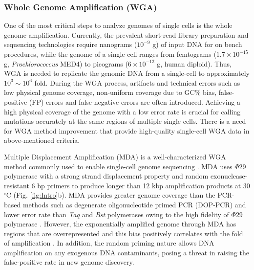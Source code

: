 \subsubsection{Whole Genome Amplification (WGA)}
One of the most critical steps to analyze genomes of single cells is the whole genome amplification. Currently, the prevalent short-read library preparation and sequencing technologies require nanograms ($10^{-9}$ g) of input DNA for on bench procedures, while the genome of a single cell ranges from femtograms ($1.7 \times 10^{-15}$ g, \textit{Prochlorococcus} MED4) to picograms ($6 \times 10^{-12}$ g, human diploid). Thus, WGA is needed to replicate the genomic DNA from a single-cell to approximately $10^3 \sim 10^6$ fold. During the WGA process, artifacts and technical errors such as low physical genome coverage, non-uniform coverage due to GC\% bias, false-positive (FP) errors and false-negative errors are often introduced. Achieving a high physical coverage of the genome with a low error rate is crucial for calling mutations accurately at the same regions of multiple single cells. There is a need for WGA method improvement that provide high-quality single-cell WGA data in above-mentioned criteria.

Multiple Displacement Amplification (MDA) \cite{Dean:2002us} is a well-characterized WGA method commonly used to enable single-cell genome sequencing \cite{Marcy:2007il,Fu:2015gl,Zhang:2006hq,Raghunathan:2005fg,Pamp:2012cj,Dodsworth:2013ih,Hess:2011gu}. MDA uses $\Phi$29 polymerase with a strong strand displacement property and random exonuclease-resistant 6 bp primers to produce longer than 12 kbp amplification products at 30 $^{\circ}$C (Fig. \ref{fig:Intro}b). MDA provides greater genome coverage than the PCR-based methods such as degenerate oligonucleotide primed PCR (DOP-PCR) and lower error rate than \textit{Taq} and \textit{Bst} polymerases owing to the high fidelity of $\Phi$29 polymerase \cite{Dean:2002us}. However, the exponentially amplified genome through MDA has regions that are overrepresented and this bias positively correlates with the fold of amplification \cite{deBourcy:2014ji}. In addition, the random priming nature allows DNA amplification on any exogenous DNA contaminants, posing a threat in raising the false-positive rate in new genome discovery. 

